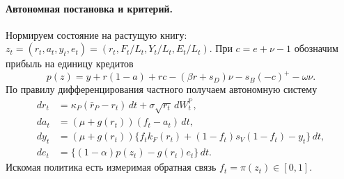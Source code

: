 \documentclass[11pt,a4paper]{article}
\newcommand{\Pp}{\mathbb P}
\begin{document}
\paragraph{Автономная постановка и критерий.}
Нормируем состояние на растущую книгу:
$z_t=(r_t,a_t,y_t,e_t)=(r_t,F_t/L_t,Y_t/L_t,E_t/L_t)$.
При $c=e+\nu-1$ обозначим прибыль на единицу кредитов
\begin{equation}
 p(z)=y+r(1-a)+rc-(\beta r+s_D)\nu
       -s_B(-c)^+-\omega\nu. \label{eq:p}
\end{equation}
По правилу дифференцирования частного получаем автономную систему
\begin{equation}
 \begin{aligned}
 dr_t&=\kappa_P(\bar r_P-r_t)\,dt+\sigma\sqrt{r_t}\,dW_t^{\Pp},\\
 da_t&=(\mu+g(r_t))(f_t-a_t)\,dt,\\
 dy_t&=(\mu+g(r_t))\{f_tk_F(r_t)
               +(1-f_t)s_V(1-f_t)-y_t\}\,dt,\\
 de_t&=\{(1-\alpha)p(z_t)-g(r_t)e_t\}\,dt .
 \end{aligned} \label{eq:normalized}
\end{equation}
Искомая политика есть измеримая обратная связь $f_t=\pi(z_t)\in[0,1]$.
\end{document}
